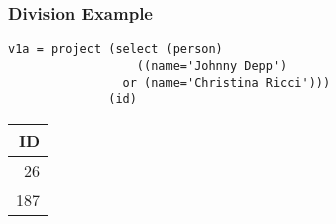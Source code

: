 \documentclass[dvipsnames]{beamer}
\theoremstyle{plain}
\begin{document}
\begin{frame}[fragile]
  \frametitle{Division Example}

  \begin{example}
    \begin{lstlisting}
v1a = project (select (person)
                  ((name='Johnny Depp')
                or (name='Christina Ricci')))
              (id)
    \end{lstlisting}

    \pause
    \begin{tiny}
    \begin{table}
      \begin{tabular}{|r|}\hline
 ID\\\hline\hline
 26\\\hline
187\\\hline
      \end{tabular}
    \end{table}
    \end{tiny}
  \end{example}
\end{frame}
\end{document}
